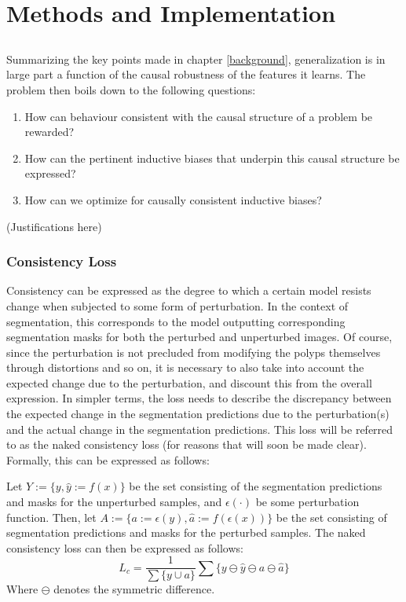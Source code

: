\chapter{Methods and Implementation}
\setcounter{chapter}{3}
\section{\alg}
	Summarizing the key points made in chapter \ref{background}, generalization is in large part a function of the causal robustness of the features it learns. The problem then boils down to the following questions:
	\begin{enumerate}
		\item How can behaviour consistent with the causal structure of a problem be rewarded? \label{loss}
		\item How can the pertinent inductive biases that underpin this causal structure be expressed? \label{mnv}
		\item How can we optimize for causally consistent inductive biases? \label{training}
	\end{enumerate}
	
	(Justifications here)

	\subsection{Consistency Loss}
	Consistency can be expressed as the degree to which a certain model resists change when subjected to some form of perturbation. In the context of segmentation, this corresponds to the model outputting corresponding segmentation masks for both the perturbed and unperturbed images. Of course, since the perturbation is not precluded from modifying the polyps themselves through distortions and so on, it is necessary to also take into account the expected change due to the perturbation, and discount this from the overall expression. In simpler terms, the loss needs to describe the discrepancy between the expected change in the segmentation predictions due to the perturbation(s) and the actual change in the segmentation predictions. This loss will be referred to as the naked consistency loss (for reasons that will soon be made clear). Formally, this can be expressed as follows:

	Let \(Y:=\{y,\hat{y}:=f(x)\}\) be the set consisting of the segmentation predictions and masks for the unperturbed samples, and \(\epsilon(\cdot)\) be some perturbation function. Then, let \(A:=\{a:=\epsilon(y),\hat{a}:=f(\epsilon(x))\}\) be the set consisting of segmentation predictions and masks for the perturbed samples. The naked consistency loss can then be expressed as follows: 
	\begin{equation}
		L_c = \frac{1}{\sum\{y \cup a \}} \sum \{y\ominus\hat{y}\ominus a\ominus\hat{a}\}
	\end{equation}
	Where \(\ominus \) denotes the symmetric difference. 
	
